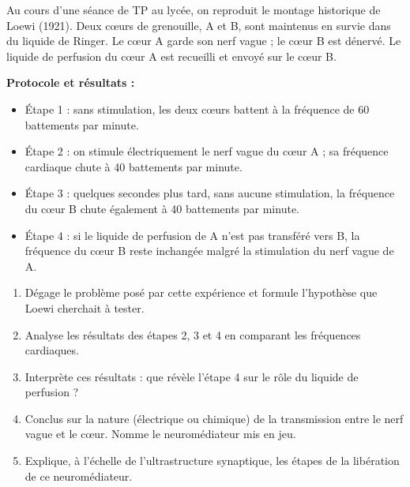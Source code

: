 \documentclass[11pt]{article}
\begin{document}
\begin{exercice}
Au cours d'une séance de TP au lycée, on reproduit le montage historique de Loewi (1921). Deux cœurs de grenouille, A et B, sont maintenus en survie dans du liquide de Ringer. Le cœur A garde son nerf vague ; le cœur B est dénervé. Le liquide de perfusion du cœur A est recueilli et envoyé sur le cœur B.

\textbf{Protocole et résultats :}
\begin{itemize}
\item Étape 1 : sans stimulation, les deux cœurs battent à la fréquence de 60 battements par minute.
\item Étape 2 : on stimule électriquement le nerf vague du cœur A ; sa fréquence cardiaque chute à 40 battements par minute.
\item Étape 3 : quelques secondes plus tard, sans aucune stimulation, la fréquence du cœur B chute également à 40 battements par minute.
\item Étape 4 : si le liquide de perfusion de A n'est pas transféré vers B, la fréquence du cœur B reste inchangée malgré la stimulation du nerf vague de A.
\end{itemize}

\begin{enumerate}
\item Dégage le problème posé par cette expérience et formule l'hypothèse que Loewi cherchait à tester.
\item Analyse les résultats des étapes 2, 3 et 4 en comparant les fréquences cardiaques.
\item Interprète ces résultats : que révèle l'étape 4 sur le rôle du liquide de perfusion ?
\item Conclus sur la nature (électrique ou chimique) de la transmission entre le nerf vague et le cœur. Nomme le neuromédiateur mis en jeu.
\item Explique, à l'échelle de l'ultrastructure synaptique, les étapes de la libération de ce neuromédiateur.
\end{enumerate}
\end{exercice}
\end{document}
